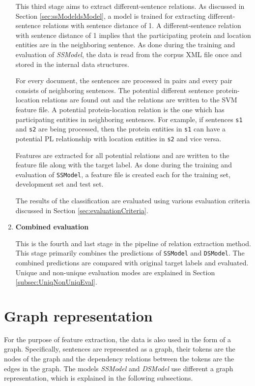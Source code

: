\begin{enumerate}
This third stage aims to extract different-sentence relations. As discussed in Section \ref{sec:ssModeldsModel}, a model is trained for extracting different-sentence relations with sentence distance of 1. A different-sentence relation with sentence distance of 1 implies that the participating protein and location entities are in the neighboring sentence. As done during the training and evaluation of \textit{SSModel}, the data is read from the corpus XML file once and stored in the internal data structures.

For every document, the sentences are processed in pairs and every pair consists of neighboring sentences. The potential different sentence protein-location relations are found out and the relations are written to the SVM feature file. A potential protein-location relation is the one which has participating entities in neighboring sentences. For example, if sentences \texttt{s1} and \texttt{s2} are being processed, then the protein entities in \texttt{s1} can have a potential PL relationship with location entities in \texttt{s2} and vice versa.

Features are extracted for all potential relations and are written to the feature file along with the target label. As done during the training and evaluation of \texttt{SSModel}, a feature file is created each for the training set, development set and test set.

The results of the classification are evaluated using various evaluation criteria discussed in Section \ref{sec:evaluationCriteria}.

\item \textbf{Combined evaluation}

This is the fourth and last stage in the pipeline of relation extraction method. This stage primarily combines the predictions of \texttt{SSModel} and \texttt{DSModel}. The combined predictions are compared with original target labels and evaluated. Unique and non-unique evaluation modes are explained in Section \ref{subsec:UniqNonUniqEval}.

\end{enumerate}

\section{Graph representation} \label{sec:graphRep}

For the purpose of feature extraction, the data is also used in the form of a graph. Specifically, sentences are represented as a graph, their tokens are the nodes of the graph and the dependency relations between the tokens are the edges in the graph. The models \textit{SSModel} and \textit{DSModel} use different a graph representation, which is explained in the following subsections.

